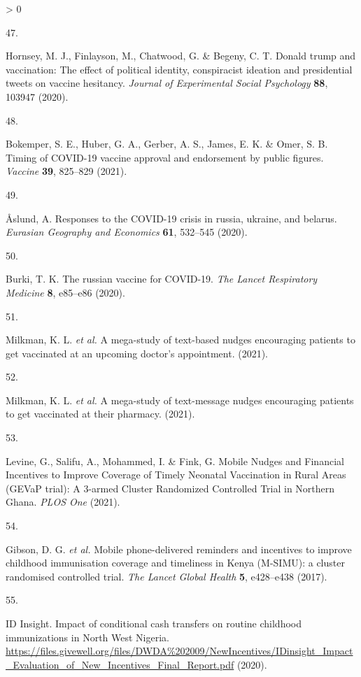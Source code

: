 \documentclass[
  12pt,
]{article}
\newlength{\cslhangindent}
\newlength{\csllabelwidth}
\newenvironment{CSLReferences}[2] %
 {%
  \setlength{\parindent}{0pt}
  \ifodd #1 \everypar{\setlength{\hangindent}{\cslhangindent}}\ignorespaces\fi
  \ifnum #2 > 0
  \setlength{\parskip}{#2\baselineskip}
  \fi
 }%
 {}
\newcommand{\CSLLeftMargin}[1]{\parbox[t]{\csllabelwidth}{#1}}
\newcommand{\CSLRightInline}[1]{\parbox[t]{\linewidth - \csllabelwidth}{#1}\break}
\begin{document}
\begin{CSLReferences}{0}{0}
\leavevmode\hypertarget{ref-hornsey2020donald}{}%
\CSLLeftMargin{47. }
\CSLRightInline{Hornsey, M. J., Finlayson, M., Chatwood, G. \& Begeny, C. T. Donald trump and vaccination: The effect of political identity, conspiracist ideation and presidential tweets on vaccine hesitancy. \emph{Journal of Experimental Social Psychology} \textbf{88}, 103947 (2020).}

\leavevmode\hypertarget{ref-bokemper2021timing}{}%
\CSLLeftMargin{48. }
\CSLRightInline{Bokemper, S. E., Huber, G. A., Gerber, A. S., James, E. K. \& Omer, S. B. Timing of COVID-19 vaccine approval and endorsement by public figures. \emph{Vaccine} \textbf{39}, 825--829 (2021).}

\leavevmode\hypertarget{ref-aaslund2020responses}{}%
\CSLLeftMargin{49. }
\CSLRightInline{Åslund, A. Responses to the COVID-19 crisis in russia, ukraine, and belarus. \emph{Eurasian Geography and Economics} \textbf{61}, 532--545 (2020).}

\leavevmode\hypertarget{ref-burki2020russian}{}%
\CSLLeftMargin{50. }
\CSLRightInline{Burki, T. K. The russian vaccine for COVID-19. \emph{The Lancet Respiratory Medicine} \textbf{8}, e85--e86 (2020).}

\leavevmode\hypertarget{ref-milkmanetal2021a}{}%
\CSLLeftMargin{51. }
\CSLRightInline{Milkman, K. L. \emph{et al.} A mega-study of text-based nudges encouraging patients to get vaccinated at an upcoming doctor's appointment. (2021).}

\leavevmode\hypertarget{ref-milkmanetal2021b}{}%
\CSLLeftMargin{52. }
\CSLRightInline{Milkman, K. L. \emph{et al.} A mega-study of text-message nudges encouraging patients to get vaccinated at their pharmacy. (2021).}

\leavevmode\hypertarget{ref-levine2021}{}%
\CSLLeftMargin{53. }
\CSLRightInline{Levine, G., Salifu, A., Mohammed, I. \& Fink, G. {Mobile Nudges and Financial Incentives to Improve Coverage of Timely Neonatal Vaccination in Rural Areas (GEVaP trial): A 3-armed Cluster Randomized Controlled Trial in Northern Ghana}. \emph{PLOS One} (2021).}

\leavevmode\hypertarget{ref-gibsonetal2017}{}%
\CSLLeftMargin{54. }
\CSLRightInline{Gibson, D. G. \emph{et al.} {Mobile phone-delivered reminders and incentives to improve childhood immunisation coverage and timeliness in Kenya (M-SIMU): a cluster randomised controlled trial}. \emph{The Lancet Global Health} \textbf{5}, e428--e438 (2017).}

\leavevmode\hypertarget{ref-idinsight}{}%
\CSLLeftMargin{55. }
\CSLRightInline{ID Insight. {Impact of conditional cash transfers on routine childhood immunizations in North West Nigeria}. \url{https://files.givewell.org/files/DWDA\%202009/NewIncentives/IDinsight_Impact_Evaluation_of_New_Incentives_Final_Report.pdf} (2020).}


\end{CSLReferences}
\end{document}
